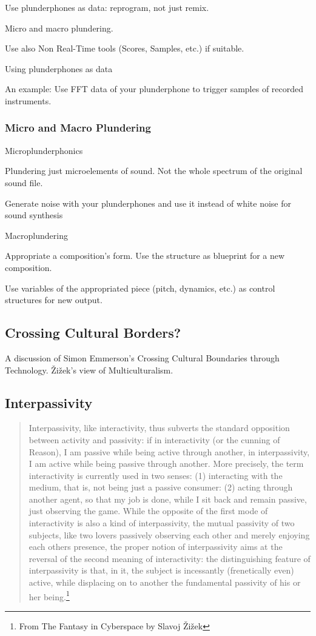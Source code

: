 Use plunderphones as data: reprogram, not just remix.

Micro and macro plundering.

Use also Non Real-Time tools (Scores, Samples, etc.) if suitable. 

Using plunderphones as data

An example: Use FFT data of your plunderphone to trigger samples of recorded instruments.

\subsubsection{Micro and Macro Plundering}

Microplunderphonics

Plundering just microelements of sound. Not the whole spectrum of the original sound file. 

Generate noise with your plunderphones and use it instead of white noise for sound synthesis


Macroplundering

Appropriate a composition’s form. Use the structure as blueprint for a new composition. 

Use variables of the appropriated piece (pitch, dynamics, etc.) as control structures for new output.

\subsection{Crossing Cultural Borders?}

A discussion of Simon Emmerson's Crossing Cultural Boundaries through Technology. 
\v{Z}i\v{z}ek's view of Multiculturalism. 


\subsection{Interpassivity}

\begin{quote}
Interpassivity, like interactivity, thus subverts the standard opposition between activity and passivity: if in interactivity (or the cunning of Reason), I am passive while being active through another, in interpassivity, I am active while being passive through another. More precisely, the term interactivity is currently used in two senses: (1) interacting with the medium, that is, not being just a passive consumer: (2) acting through another agent, so that my job is done, while I sit back and remain passive, just observing the game. While the opposite of the first mode of interactivity is also a kind of interpassivity, the mutual passivity of two subjects, like two lovers passively observing each other and merely enjoying each others presence, the proper notion of interpassivity aims at the reversal of the second meaning of interactivity: the distinguishing feature of interpassivity is that, in it, the subject is incessantly (frenetically even) active, while displacing on to another the fundamental passivity of his or her being.\footnote{From The Fantasy in Cyberspace by Slavoj \v{Z}i\v{z}ek}
\end{quote}



\label{ch:introduction}
